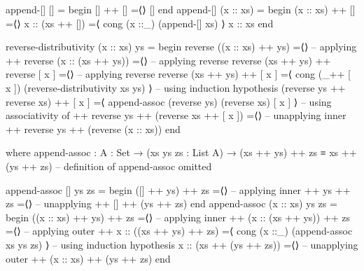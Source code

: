 \documentclass[a4paper,UKenglish]{tufte-handout}
\theoremstyle{definition}
\begin{document}
\begin{fullwidth}
\begin{AgdaAlign}
\begin{AgdaSuppressSpace}
\begin{code}[number]
\end{code}
\begin{code}[hide]
        append-[] [] =
          begin
            [] ++ []
          =⟨⟩
            []
          end
        append-[] (x :: xs) =
          begin
            (x :: xs) ++ []
          =⟨⟩
            x :: (xs ++ [])
          =⟨ cong (x ::_) (append-[] xs) ⟩
            x :: xs
          end
\end{code}
\begin{code}[number]
    reverse-distributivity (x :: xs) ys =
      begin
        reverse ((x :: xs) ++ ys)
      =⟨⟩                                                   -- applying ++
        reverse (x :: (xs ++ ys))
      =⟨⟩                                                   -- applying reverse
        reverse (xs ++ ys) ++ reverse [ x ]
      =⟨⟩                                                   -- applying reverse
        reverse (xs ++ ys) ++ [ x ]
      =⟨ cong (_++ [ x ]) (reverse-distributivity xs ys) ⟩  -- using induction hypothesis
        (reverse ys ++ reverse xs) ++ [ x ]
      =⟨ append-assoc (reverse ys) (reverse xs) [ x ] ⟩     -- using associativity of ++
        reverse ys ++ (reverse xs ++ [ x ])
      =⟨⟩                                                   -- unapplying inner ++
        reverse ys ++ (reverse (x :: xs))
      end

      where
        append-assoc : {A : Set} → (xs ys zs : List A)
                     → (xs ++ ys) ++ zs ≡ xs ++ (ys ++ zs)
        -- definition of append-assoc omitted

\end{code}
\begin{code}[hide]
        append-assoc [] ys zs =
          begin
            ([] ++ ys) ++ zs
          =⟨⟩                                        -- applying inner ++
            ys ++ zs
          =⟨⟩                                        -- unapplying ++
            [] ++ (ys ++ zs)
          end
        append-assoc (x :: xs) ys zs =
          begin
            ((x :: xs) ++ ys) ++ zs
          =⟨⟩                                        -- applying inner ++
            (x :: (xs ++ ys)) ++ zs
          =⟨⟩                                        -- applying outer ++
            x :: ((xs ++ ys) ++ zs)
          =⟨ cong (x ::_) (append-assoc xs ys zs) ⟩  -- using induction hypothesis
            x :: (xs ++ (ys ++ zs))
          =⟨⟩                                        -- unapplying outer ++
            (x :: xs) ++ (ys ++ zs)
          end
\end{code}
\end{AgdaSuppressSpace}
\end{AgdaAlign}
\end{fullwidth}
\end{document}
